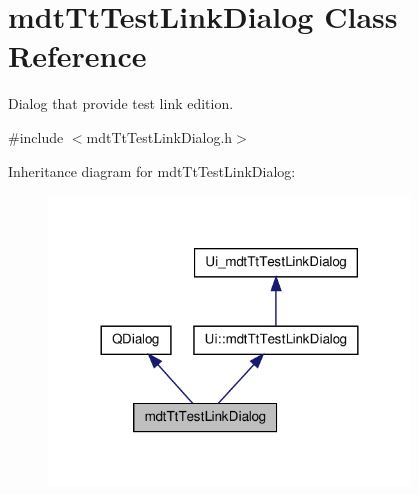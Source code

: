 \hypertarget{classmdt_tt_test_link_dialog}{\section{mdt\-Tt\-Test\-Link\-Dialog Class Reference}
\label{classmdt_tt_test_link_dialog}
}


Dialog that provide test link edition.  




{\ttfamily \#include $<$mdt\-Tt\-Test\-Link\-Dialog.\-h$>$}



Inheritance diagram for mdt\-Tt\-Test\-Link\-Dialog\-:\nopagebreak
\begin{figure}[H]
\begin{center}
\leavevmode
\includegraphics[width=272pt]{classmdt_tt_test_link_dialog__inherit__graph}
\end{center}
\end{figure}


